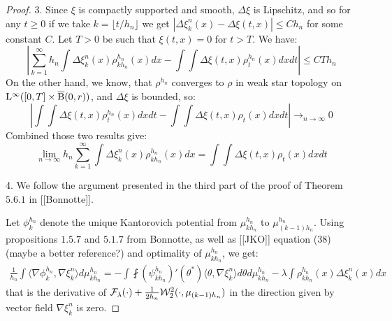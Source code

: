 \begin{proof}
3. Since $\xi$ is compactly supported and smooth, $\Delta \xi$ is Lipschitz, and so for any $ t \geq 0$ if we take $k = \lfloor t/h_n \rfloor$ we get $| \Delta \xi_k^n(x) - \Delta \xi(t,x) | \leq C h_n$ for some constant $C$. Let $T > 0$ be such that $\xi(t,x) = 0 $ for $t > T$. We have:
\[
\left| \sum_{k=1}^{\infty} h_n \int \Delta \xi_k^n(x) \rho_{kh_n}^{h_n}(x) dx - \int \int \Delta \xi(t,x) \rho_{t}^{h_n}(x) dx dt \right| \leq CTh_n 
\]
On the other hand,  we know, that $\rho^{h_n}$ converges to $\rho$ in weak star topology on $\mathrm{L}^{\infty}([0,T] \times \operatorname{\overline{B}}(0,r))$, and $\Delta \xi$ is bounded, so:
\[
\left| \int \int \Delta \xi(t,x) \rho_{t}^{h_n}(x) dx dt - \int \int \Delta \xi (t,x) \rho_t(x) dx dt \right| \rightarrow_{n \rightarrow \infty} 0
\]
Combined those two results give:
\begin{equation} \label{thm:cont_proof_part3}
\lim_{n \rightarrow \infty} h_n \sum_{k=1}^{\infty} \int \Delta \xi_k^n(x) \rho_{kh_n}^{h_n}(x) dx = \int \int \Delta \xi (t,x) \rho_t(x) dx dt
\end{equation}



4. We follow the argument presented in the third part of the proof of Theorem $5.6.1$ in [[Bonnotte]].

Let $\phi_{k}^{h_n}$ denote the unique Kantorovich potential from $\mu_{kh_n}^{h_n}$ to $\mu_{(k-1)h_n}^{h_n}$. Using propositions $1.5.7$ and $5.1.7$ from Bonnotte, as well as [[JKO]] equation (38) (maybe a better reference?) and optimality of $\mu_{kh_n}^{h_n}$, we get:
\begin{multline} \label{thm:cont_proof_eq0}
\frac{1}{h_n} \int \langle \nabla \phi_k^{h_n} , \nabla \xi_{k}^n \rangle d\mu_{kh_n}^{h_n} =  - \int \fint (\psi_{kh_n}^{h_n})'(\theta^{*}) \langle \theta, \nabla \xi_k^n \rangle d\theta d\mu_{kh_n}^{h_n} - \lambda \int  \rho_{kh_n}^{h_n}(x) \Delta \xi_k^n(x)  dx 
\end{multline}
that is the derivative of $\mathcal{F}_{\lambda}(\cdot) + \frac{1}{2h_n}{\cal W}_2^2(\cdot, \mu_{(k-1)h_n})$ in the direction given by vector field $\nabla \xi_k^n$ is zero.


\end{proof}
